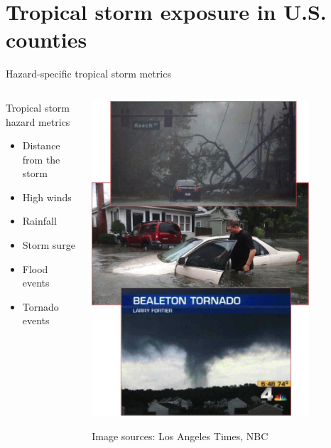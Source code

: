 \documentclass[ignorenonframetext,]{beamer}
\begin{document}
\section{Tropical storm exposure in U.S.
counties}\label{tropical-storm-exposure-in-u.s.-counties}

\begin{frame}{Hazard-specific tropical storm metrics}

\begin{columns}
\begin{column}{0.5\textwidth}
\begin{block}{Tropical storm hazard metrics}
   \begin{itemize}
    \item Distance from the storm
    \item High winds
    \item Rainfall
    \item Storm surge
    \item Flood events
    \item Tornado events
   \end{itemize}
\end{block}
\end{column}
\begin{column}{0.5\textwidth}  
    \vspace{-0.25cm}
    \begin{center}
     \includegraphics[width=0.8\textwidth]{storm_hazards.png}
     \end{center}
     \vspace{-0.25cm}
     \scriptsize{Image sources: Los Angeles Times, NBC}
\end{column}
\end{columns}

\end{frame}
\end{document}
